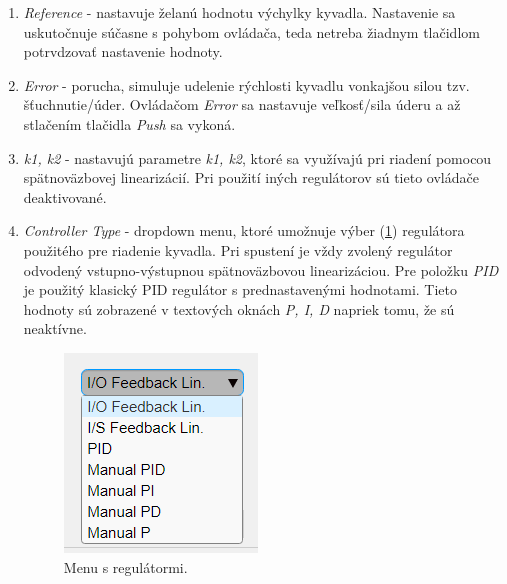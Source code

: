  \begin{enumerate}
 	\item \textit{Reference} - nastavuje želanú hodnotu výchylky kyvadla. Nastavenie sa uskutočnuje súčasne s pohybom ovládača, teda netreba žiadnym tlačidlom potrvdzovať nastavenie hodnoty. 
 	\item \textit{Error} - porucha, simuluje udelenie rýchlosti kyvadlu vonkajšou silou tzv. šťuchnutie/úder. Ovládačom \textit{Error} sa nastavuje veľkosť/sila úderu a až stlačením tlačidla \textit{Push} sa vykoná. 
 	\item \textit{k1, k2} - nastavujú parametre \textit{k1, k2}, ktoré sa využívajú pri riadení pomocou spätnoväzbovej linearizácií. Pri použití iných regulátorov sú  tieto ovládače deaktivované.
 	\item \textit{Controller Type} - dropdown menu, ktoré umožnuje výber (\cref{fig:list}) regulátora použitého pre riadenie kyvadla. Pri spustení je vždy zvolený regulátor odvodený vstupno-výstupnou spätnoväzbovou linearizáciou. Pre položku \textit{PID} je použitý klasický PID regulátor s prednastavenými hodnotami. Tieto hodnoty sú zobrazené v textových oknách \textit{P, I, D} napriek tomu, že sú neaktívne. 	
 \begin{figure}[h!]
	\centering
	\includegraphics[width=0.6\linewidth]{list}
	\caption{Menu s regulátormi.}
 	\label{fig:list}
 \end{figure}


\end{enumerate}
